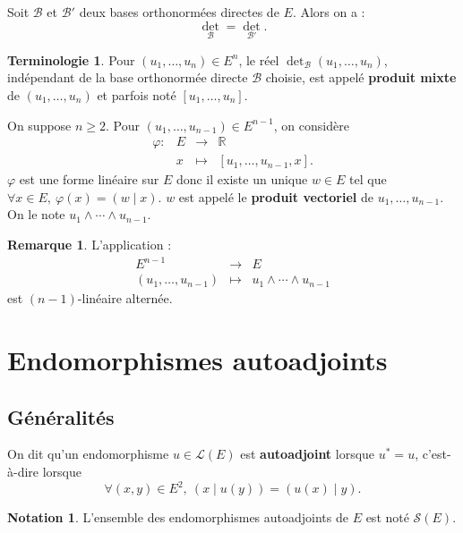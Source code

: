 \documentclass[french]{article}
\newcommand{\R}{\mathbb{R}}
\newcommand{\st}{^*}
\theoremstyle{plain}
\theoremstyle{definition}
\newtheorem*{rmq}{Remarque}
\newtheorem*{notation}{Notation}
\newtheorem*{terminologie}{Terminologie}
\theoremstyle{remark}
\begin{document}
\begin{prop}
	Soit $\mathcal{B}$ et $\mathcal{B}'$ deux bases orthonormées directes de $E$. Alors on a : $$\det_\mathcal{B}=\det_{\mathcal{B}'}.$$
\end{prop}

\begin{terminologie}
	Pour $(u_1,\ldots,u_n)\in E^n$, le réel $\det_\mathcal{B}(u_1,\ldots,u_n)$, indépendant de la base orthonormée directe $\mathcal{B}$ choisie, est appelé \textbf{produit mixte} de $(u_1,\ldots,u_n)$ et parfois noté $[u_1,\ldots,u_n]$.
\end{terminologie}

\begin{dfn}
	On suppose $n\geqslant 2$. Pour $(u_1,\ldots,u_{n-1})\in E^{n-1}$, on considère $$\begin{array}{lrcl}
		\varphi:&E&\longrightarrow&\R \\
		&x&\longmapsto&[u_1,\ldots,u_{n-1},x].
	\end{array}$$ $\varphi$ est une forme linéaire sur $E$ donc il existe un unique $w\in E$ tel que $\forall x\in E,\ \varphi(x)=(w\mid x)$. $w$ est appelé le \textbf{produit vectoriel} de $u_1,\ldots,u_{n-1}$. On le note $u_1\wedge \cdots\wedge u_{n-1}$.
\end{dfn}

\begin{rmq}
	L'application : $$\begin{array}{rcl}
		E^{n-1}&\longrightarrow& E\\
		(u_1,\ldots,u_{n-1})&\longmapsto&u_1\wedge\cdots\wedge u_{n-1}
	\end{array}$$ est $(n-1)$-linéaire alternée.
\end{rmq}

\section{Endomorphismes autoadjoints}


\subsection{Généralités}

\begin{dfn}
	On dit qu'un endomorphisme $u\in\mathcal{L}(E)$ est \textbf{autoadjoint} lorsque $u\st=u$, c'est-à-dire lorsque $$\forall (x,y)\in E^2,\ (x\mid u(y))=(u(x)\mid y).$$
\end{dfn}

\begin{notation}
	L'ensemble des endomorphismes autoadjoints de $E$ est noté $\mathcal{S}(E)$.
\end{notation}
\end{document}
